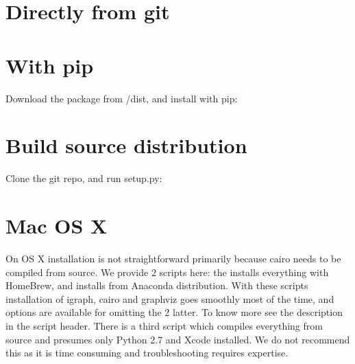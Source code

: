 \documentclass[letterpaper,10pt,english]{sphinxmanual}
\begin{document}
\section{Directly from git}
\label{\detokenize{index:directly-from-git}}
%
\begin{sphinxVerbatim}[commandchars=\\\{\}]
  
\end{sphinxVerbatim}


\section{With pip}
\label{\detokenize{index:with-pip}}
Download the package from /dist, and install with pip:

%
\begin{sphinxVerbatim}[commandchars=\\\{\}]
  
\end{sphinxVerbatim}


\section{Build source distribution}
\label{\detokenize{index:build-source-distribution}}
Clone the git repo, and run setup.py:

%
\begin{sphinxVerbatim}[commandchars=\\\{\}]
  
\end{sphinxVerbatim}


\section{Mac OS X}
\label{\detokenize{index:mac-os-x}}
On OS X installation is not straightforward primarily because cairo needs to
be compiled from source. We provide 2 scripts here: the
 installs everything with HomeBrew, and
 installs from Anaconda distribution. With these
scripts installation of igraph, cairo and graphviz goes smoothly most of the
time, and options are available for omitting the 2 latter. To know more see
the description in the script header. There is a third script
 which compiles everything from source and presumes
only Python 2.7 and Xcode installed. We do not recommend this as it is time
consuming and troubleshooting requires expertise.
\end{document}

